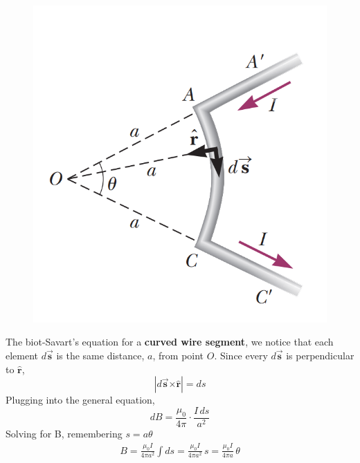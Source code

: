 \documentclass[12pt, titlepage, oneside]{article}
\let\oldhat\hat
\let\oldvec\vec
\newcommand{\cross}{\bm{\times}}
\renewcommand{\hat}[1]{\oldhat{\mathbf{#1}}}
\renewcommand{\vec}[1]{\oldvec{\bm{#1}}}
\renewcommand{\hat}[1]{\oldhat{\bm{#1}}}
\renewcommand{\b}[1]{\textbf{#1}}
\begin{document}
\begin{figure}
	\begin{center}\vspace{-1cm}
		\includegraphics[scale=.5]{3.png}
	\end{center}
\end{figure}
The biot-Savart's equation for a \b{curved wire segment}, we notice that each element $d\vec{s}$ is the same distance, $a$, from point $O$. Since every $d\vec{s}$ is perpendicular to $\hat{r}$,
\begin{equation}
|d\vec{s}\cross \hat{r}| = ds
\end{equation}
Plugging into the general equation, 
\begin{equation}
dB = \frac{\mu_0}{4\pi}\cdot\frac{I \, ds}{a^2}
\end{equation}
Solving for B, remembering $s = a\theta$
\begin{align}
B = \frac{\mu_0 I}{4\pi a^2}\int ds = \frac{\mu_0 I}{4\pi a^2}\, s = \frac{\mu_0 I}{4\pi a}\,\theta
\end{align}
\end{document}
